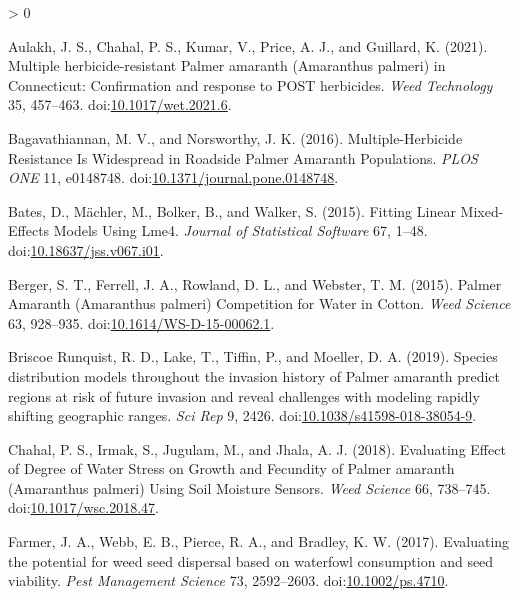 \documentclass[utf8]{frontiersSCNS}
\newlength{\cslhangindent}
\newenvironment{CSLReferences}[2] %
 {%
  \setlength{\parindent}{0pt}
  \ifodd #1 \everypar{\setlength{\hangindent}{\cslhangindent}}\ignorespaces\fi
  \ifnum #2 > 0
  \setlength{\parskip}{#2\baselineskip}
  \fi
 }%
 {}
\begin{document}
\hypertarget{refs}{}
\begin{CSLReferences}{1}{0}
\leavevmode\hypertarget{ref-aulakh2021}{}%
Aulakh, J. S., Chahal, P. S., Kumar, V., Price, A. J., and Guillard, K.
(2021). Multiple herbicide-resistant {Palmer} amaranth ({Amaranthus}
palmeri) in {Connecticut}: Confirmation and response to {POST}
herbicides. \emph{Weed Technology} 35, 457--463.
doi:\href{https://doi.org/10.1017/wet.2021.6}{10.1017/wet.2021.6}.

\leavevmode\hypertarget{ref-bagavathiannan2016}{}%
Bagavathiannan, M. V., and Norsworthy, J. K. (2016). Multiple-{Herbicide
Resistance Is Widespread} in {Roadside Palmer Amaranth Populations}.
\emph{PLOS ONE} 11, e0148748.
doi:\href{https://doi.org/10.1371/journal.pone.0148748}{10.1371/journal.pone.0148748}.

\leavevmode\hypertarget{ref-bates2015}{}%
Bates, D., Mächler, M., Bolker, B., and Walker, S. (2015). Fitting
{Linear Mixed}-{Effects Models Using} Lme4. \emph{Journal of Statistical
Software} 67, 1--48.
doi:\href{https://doi.org/10.18637/jss.v067.i01}{10.18637/jss.v067.i01}.

\leavevmode\hypertarget{ref-berger2015}{}%
Berger, S. T., Ferrell, J. A., Rowland, D. L., and Webster, T. M.
(2015). Palmer {Amaranth} ({Amaranthus} palmeri) {Competition} for
{Water} in {Cotton}. \emph{Weed Science} 63, 928--935.
doi:\href{https://doi.org/10.1614/WS-D-15-00062.1}{10.1614/WS-D-15-00062.1}.

\leavevmode\hypertarget{ref-briscoerunquist2019}{}%
Briscoe Runquist, R. D., Lake, T., Tiffin, P., and Moeller, D. A.
(2019). Species distribution models throughout the invasion history of
{Palmer} amaranth predict regions at risk of future invasion and reveal
challenges with modeling rapidly shifting geographic ranges. \emph{Sci
Rep} 9, 2426.
doi:\href{https://doi.org/10.1038/s41598-018-38054-9}{10.1038/s41598-018-38054-9}.

\leavevmode\hypertarget{ref-chahal2018}{}%
Chahal, P. S., Irmak, S., Jugulam, M., and Jhala, A. J. (2018).
Evaluating {Effect} of {Degree} of {Water Stress} on {Growth} and
{Fecundity} of {Palmer} amaranth ({Amaranthus} palmeri) {Using Soil
Moisture Sensors}. \emph{Weed Science} 66, 738--745.
doi:\href{https://doi.org/10.1017/wsc.2018.47}{10.1017/wsc.2018.47}.

\leavevmode\hypertarget{ref-farmer2017}{}%
Farmer, J. A., Webb, E. B., Pierce, R. A., and Bradley, K. W. (2017).
Evaluating the potential for weed seed dispersal based on waterfowl
consumption and seed viability. \emph{Pest Management Science} 73,
2592--2603. doi:\href{https://doi.org/10.1002/ps.4710}{10.1002/ps.4710}.


\end{CSLReferences}
\end{document}
